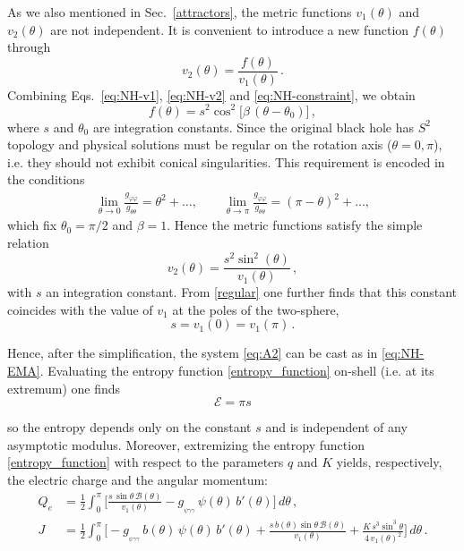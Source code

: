 \documentclass[11pt]{article}
\numberwithin{equation}{section} %
\begin{document}
 As we also mentioned in Sec.~\ref{attractors}, the metric functions
\(v_1(\theta)\) and \(v_2(\theta)\) are not independent. 
It is convenient to introduce a new function \(f(\theta)\) through
\begin{equation}
  v_2(\theta) = \frac{f(\theta)}{v_1(\theta)}\,.
\end{equation}
Combining Eqs.~\eqref{eq:NH-v1}, \eqref{eq:NH-v2} and
\eqref{eq:NH-constraint}, we obtain
\begin{equation}
  f(\theta) = s^{2} \cos^{2}\!\big[\beta\,(\theta-\theta_{0})\big] \, ,
\end{equation}
where \(s\) and \(\theta_{0}\) are integration constants. Since the original black hole has $S^2$ topology and physical solutions must be regular on the rotation axis
(\(\theta = 0,\pi\)), i.e. they should not exhibit conical singularities.  
This requirement is encoded in the conditions
\begin{eqnarray}
\label{regular}
 \lim_{\theta \to 0}\frac{g_{\varphi\varphi}}{g_{\theta\theta}}
   = \theta^{2} + \dots,
 \qquad
 \lim_{\theta \to \pi}\frac{g_{\varphi\varphi}}{g_{\theta\theta}}
   = (\pi-\theta)^{2} + \dots,
\end{eqnarray}
which fix
\(\theta_{0} = \pi/2\) and \(\beta = 1\).  Hence the metric functions
satisfy the simple relation
\begin{equation}
  v_2(\theta) = \frac{s^{2}\sin^2(\theta)}{v_1(\theta)}\,,
\end{equation}
with \(s\) an integration constant. From \eqref{regular} one further
finds that this constant coincides with the value of \(v_1\) at the
poles of the two-sphere,
\begin{equation}
\label{new-cond}
  s = v_1(0) = v_1(\pi)\,.
\end{equation}

Hence, after the simplification, the system \eqref{eq:A2} can be cast as in \eqref{eq:NH-EMA}.   {Evaluating the entropy function \eqref{entropy_function} on-shell (i.e. at its extremum)  one finds} 
%
\begin{equation}
    \mathcal{E}=\pi s
\end{equation}

{so the entropy depends only on the constant $s$ and is independent of any asymptotic modulus. Moreover, extremizing the entropy function \eqref{entropy_function} with respect to
the parameters \(q\) and \(K\) yields, respectively, the electric charge and the
angular momentum:}
%
\begin{align}
Q_e &=
\frac{1}{2}\int_{0}^{\pi}
\Biggl[
\frac{s\,\sin\theta\,\mathcal{B}(\theta)}{v_1(\theta)}
- g_{_{\psi\gamma\gamma}}\,\psi(\theta)\,b'(\theta)
\Biggr]\,d\theta \, , \label{electric_attractor}
\\[0.5em]
J &=
\frac{1}{2}\int_{0}^{\pi}
\Biggl[
- g_{_{\psi\gamma\gamma}}\,b(\theta)\,\psi(\theta)\,b'(\theta)
+ \frac{s\,b(\theta)\sin\theta\,\mathcal{B}(\theta)}{v_1(\theta)}
+ \frac{K\,s^{3}\sin^{3}\theta}{4\,v_1(\theta)^{2}}
\Biggr]\,d\theta \,.
\end{align}
\end{document}
